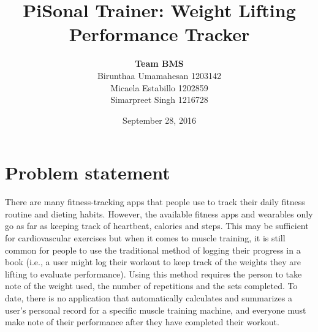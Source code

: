 \documentclass{article}
\title{PiSonal Trainer: Weight Lifting Performance Tracker}
\author{\textbf{Team BMS} \\ Birunthaa Umamahesan 1203142 \\ Micaela Estabillo 1202859 \\ Simarpreet Singh 1216728}
\date{September 28, 2016}
\begin{document}
\maketitle

\section{Problem statement}

There are many fitness-tracking apps that people use to track their daily fitness routine and dieting habits. However, the available fitness apps and wearables only go as far as keeping track of heartbeat, calories and steps. This may be sufficient for cardiovascular exercises but when it comes to muscle training, it is still common for people to use the traditional method of logging their progress in a book (i.e., a user might log their workout to keep track of the weights they are lifting to evaluate performance).  Using this method requires the person to take note of the weight used, the number of repetitions and the sets completed. To date, there is no application that automatically calculates and summarizes a user’s personal record for a specific muscle training machine, and everyone must make note of their performance after they have completed their workout.
\end{document}
